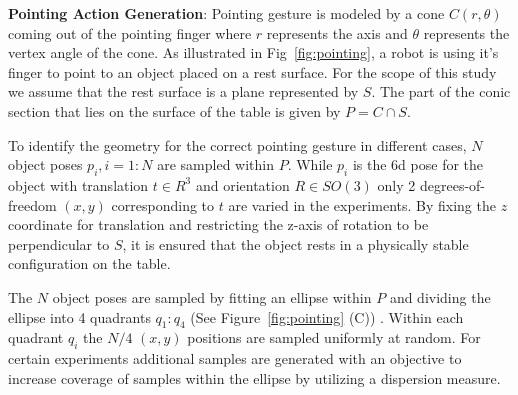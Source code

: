


\noindent\textbf{Pointing Action Generation}: Pointing gesture is modeled by a cone $C(r, \theta)$ coming out of the pointing finger where $r$ represents the axis and $\theta$ represents the vertex angle of the cone. As illustrated in Fig~\ref{fig:pointing}, a robot is using it's finger to point to an object placed on a rest surface. For the scope of this study we assume that the rest surface is a plane represented by $S$. The part of the conic section that lies on the surface of the table is given by $P=C \cap S$.

To identify the geometry for the correct pointing gesture in different cases, $N$ object poses $p_i, i=1:N$ are sampled within $P$. While $p_i$ is the 6d pose for the object with translation $t \in R^3$ and orientation $R \in SO(3)$ only 2  degrees-of-freedom $(x, y)$ corresponding to $t$ are varied in the experiments. By fixing the $z$ coordinate for translation and restricting the z-axis of rotation to be perpendicular to $S$, it is ensured that the object rests in a physically stable configuration on the table.

The $N$ object poses are sampled by fitting an ellipse within $P$ and dividing the ellipse into 4 quadrants $q_1:q_4$ (See Figure~\ref{fig:pointing} (C)) . Within each quadrant $q_i$ the $N/4$ $(x,y)$ positions are sampled uniformly at random. For certain experiments additional samples are generated with an objective to increase coverage of samples within the ellipse by utilizing a dispersion measure.

